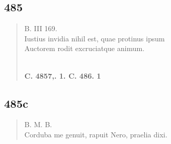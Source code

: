 \documentclass[11pt, a4paper]{report}
\begin{document}
            \subsection*{485}
      \begin{verse}
      B. III 169. \\ Iustius invidia nihil est, quae protinus ipsum \\ Auctorem rodit excruciatque animum. \\ 
        ﻿\pagebreak 
    \begin{center} \textbf{C. 4857,. 1. C. 486. 1} \end{center} \marginpar{[29]} 
      \end{verse}
  
            \subsection*{485c}
      \begin{verse}
      B. M. B. \\ Corduba me genuit, rapuit Nero, praelia dixi. \\ 
      \end{verse}
  
\end{document}
